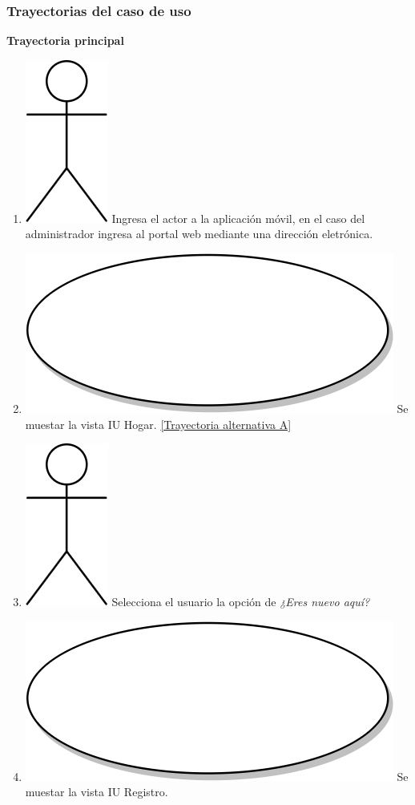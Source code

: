 \subsubsection{Trayectorias del caso de uso}
\textbf{Trayectoria principal}
\begin{enumerate}
  \item {\includegraphics[scale=.1]{Capitulo3/img/actor.png} Ingresa el actor a la aplicación móvil, en el caso del administrador ingresa al portal web mediante una dirección eletrónica.}
  \item {\includegraphics[scale=.05]{Capitulo3/img/proceso.png} Se muestar la vista IU Hogar. \hyperref[cu2_ta_a]{[Trayectoria alternativa A]}}
  \item {\includegraphics[scale=.1]{Capitulo3/img/actor.png} Selecciona el usuario la opción de \textit{¿Eres nuevo aquí?}}
  \item {\includegraphics[scale=.05]{Capitulo3/img/proceso.png} Se muestar la vista IU Registro.}

\end{enumerate}
